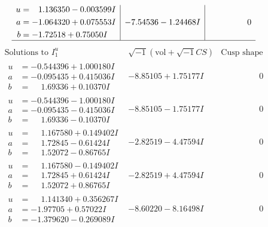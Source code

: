 \documentclass[1p]{elsarticle_modified}
\theoremstyle{definition}
\newcommand{\I}{\sqrt{-1}}
\begin{document}
$$\begin{array}{c|c|c}
\begin{aligned}
u &= \phantom{-}1.136350 - 0.003599 I \\
a &= -1.064320 + 0.075553 I \\
b &= -1.72518 + 0.75050 I\end{aligned}
 & -7.54536 - 1.24468 I & \phantom{-0.000000 } 0\\
 \hline 
 \end{array}$$\newpage$$\begin{array}{c|c|c}  
\text{Solutions to }I^u_{1}& \I (\text{vol} + \sqrt{-1}CS) & \text{Cusp shape}\\
 \hline 
\begin{aligned}
u &= -0.544396 + 1.000180 I \\
a &= -0.095435 + 0.415036 I \\
b &= \phantom{-}1.69336 + 0.10370 I\end{aligned}
 & -8.85105 + 1.75177 I & \phantom{-0.000000 } 0 \\ \hline\begin{aligned}
u &= -0.544396 - 1.000180 I \\
a &= -0.095435 - 0.415036 I \\
b &= \phantom{-}1.69336 - 0.10370 I\end{aligned}
 & -8.85105 - 1.75177 I & \phantom{-0.000000 } 0 \\ \hline\begin{aligned}
u &= \phantom{-}1.167580 + 0.149402 I \\
a &= \phantom{-}1.72845 - 0.61424 I \\
b &= \phantom{-}1.52072 - 0.86765 I\end{aligned}
 & -2.82519 - 4.47594 I & \phantom{-0.000000 } 0 \\ \hline\begin{aligned}
u &= \phantom{-}1.167580 - 0.149402 I \\
a &= \phantom{-}1.72845 + 0.61424 I \\
b &= \phantom{-}1.52072 + 0.86765 I\end{aligned}
 & -2.82519 + 4.47594 I & \phantom{-0.000000 } 0 \\ \hline\begin{aligned}
u &= \phantom{-}1.141340 + 0.356267 I \\
a &= -1.97705 + 0.57022 I \\
b &= -1.379620 - 0.269089 I\end{aligned}
 & -8.60220 - 8.16498 I & \phantom{-0.000000 } 0 \\ \hline\begin{aligned}

\end{aligned}
\end{array}$$
\end{document}
